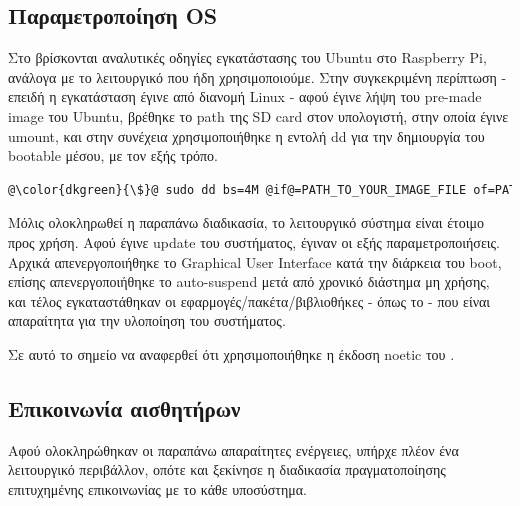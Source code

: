 \subsection{Παραμετροποίηση OS} 
Στο \cite{ubuntu-raspi-intall} βρίσκονται αναλυτικές οδηγίες εγκατάστασης του Ubuntu στο Ra\-spbe\-rry Pi, ανάλογα με το λειτουργικό που ήδη χρησιμοποιούμε. Στην συγκεκριμένη περίπτωση - επειδή η εγκατάσταση έγινε από διανομή Linux - αφού έγινε λήψη του pre-made image του Ubuntu, βρέθηκε το path της SD card στον υπολογιστή, στην οποία έγινε umount, και στην συνέχεια χρησιμοποιήθηκε η εντολή dd για την δημιουργία του bootable μέσου, με τον εξής τρόπο.

\begin{lstlisting}[language=sh, escapechar=@, caption={Create bootable SD from Linux},label=create-bootable-sd-terminal]
    @\color{dkgreen}{\$}@ sudo dd bs=4M @if@=PATH_TO_YOUR_IMAGE_FILE of=PATH_TO_YOUR_SD_CARD status=progress
\end{lstlisting}

Μόλις ολοκληρωθεί η παραπάνω διαδικασία, το λειτουργικό σύστημα είναι έτοιμο προς χρήση. Αφού έγινε update του συστήματος, έγιναν οι εξής παραμετροποιήσεις. Αρχικά απενεργοποιήθηκε το Graphical User Interface κατά την διάρκεια του boot, επίσης απενεργοποιήθηκε το auto-suspend μετά από χρονικό διάστημα μη χρήσης, και τέλος εγκαταστάθηκαν οι εφαρμογές/πακέτα/βιβλιοθήκες - όπως το  - που είναι απαραίτητα για την υλοποίηση του συστήματος. 

Σε αυτό το σημείο να αναφερθεί ότι χρησιμοποιήθηκε η έκδοση noetic του .


\subsection{Επικοινωνία αισθητήρων} 
Αφού ολοκληρώθηκαν οι παραπάνω απαραίτητες ενέργειες, υπήρχε πλέον ένα λειτουργικό περιβάλλον, οπότε και ξεκίνησε η διαδικασία πραγματοποίησης ε\-πι\-τυ\-χη\-μέ\-νης επικοινωνίας με το κάθε υποσύστημα.

